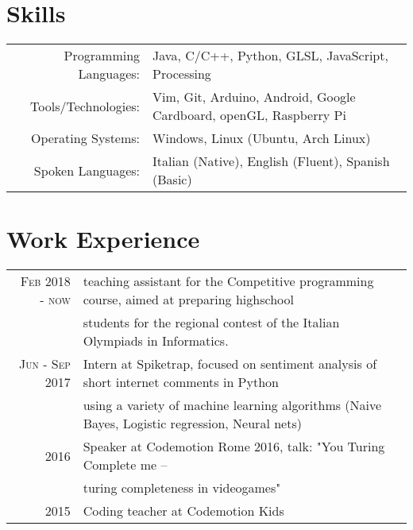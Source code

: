 \documentclass[a4paper,10pt]{article} %
\begin{document}
\section{Skills}
\begin{tabular}{rl}
Programming Languages: & Java, C/C++, Python, GLSL, JavaScript, Processing\\
Tools/Technologies: & Vim, Git, Arduino, Android, Google Cardboard, openGL, Raspberry Pi\\
Operating Systems: & Windows, Linux (Ubuntu, Arch Linux)\\
Spoken Languages: & Italian (Native), English (Fluent), Spanish (Basic)\\
\end{tabular}

\bigskip

\section{Work Experience}
    \begin{tabular}{rl}
	\textsc{Feb 2018 - now}  & teaching assistant for the Competitive programming course, aimed at preparing highschool \\
	     & students for the regional contest of the Italian Olympiads in Informatics.  \\
	\textsc{Jun - Sep  2017} & Intern at Spiketrap, focused on sentiment analysis of short internet comments in Python\\
	     & using a variety of machine learning algorithms (Naive Bayes, Logistic regression, Neural nets) \\
        2016 & Speaker at Codemotion Rome 2016, talk: "You Turing Complete me – \\
	     & turing completeness in videogames"\\
        2015 & Coding teacher at Codemotion Kids \\
    \end{tabular}

\bigskip

\end{document}
